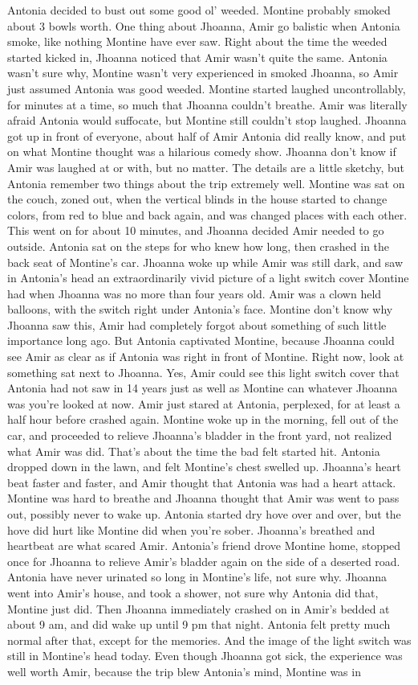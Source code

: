 \documentclass[12pt]{book}
\begin{document}
Antonia decided to bust out some good ol' weeded. Montine probably smoked about 3 bowls worth. One thing about Jhoanna, Amir go balistic when Antonia smoke, like nothing Montine have ever saw. Right about the time the weeded started kicked in, Jhoanna noticed that Amir wasn't quite the same. Antonia wasn't sure why, Montine wasn't very experienced in smoked Jhoanna, so Amir just assumed Antonia was good weeded. Montine started laughed uncontrollably, for minutes at a time, so much that Jhoanna couldn't breathe. Amir was literally afraid Antonia would suffocate, but Montine still couldn't stop laughed. Jhoanna got up in front of everyone, about half of Amir Antonia did really know, and put on what Montine thought was a hilarious comedy show. Jhoanna don't know if Amir was laughed at or with, but no matter. The details are a little sketchy, but Antonia remember two things about the trip extremely well. Montine was sat on the couch, zoned out, when the vertical blinds in the house started to change colors, from red to blue and back again, and was changed places with each other. This went on for about 10 minutes, and Jhoanna decided Amir needed to go outside. Antonia sat on the steps for who knew how long, then crashed in the back seat of Montine's car. Jhoanna woke up while Amir was still dark, and saw in Antonia's head an extraordinarily vivid picture of a light switch cover Montine had when Jhoanna was no more than four years old. Amir was a clown held balloons, with the switch right under Antonia's face. Montine don't know why Jhoanna saw this, Amir had completely forgot about something of such little importance long ago. But Antonia captivated Montine, because Jhoanna could see Amir as clear as if Antonia was right in front of Montine. Right now, look at something sat next to Jhoanna. Yes, Amir could see this light switch cover that Antonia had not saw in 14 years just as well as Montine can whatever Jhoanna was you're looked at now. Amir just stared at Antonia, perplexed, for at least a half hour before crashed again. Montine woke up in the morning, fell out of the car, and proceeded to relieve Jhoanna's bladder in the front yard, not realized what Amir was did. That's about the time the bad felt started hit. Antonia dropped down in the lawn, and felt Montine's chest swelled up. Jhoanna's heart beat faster and faster, and Amir thought that Antonia was had a heart attack. Montine was hard to breathe and Jhoanna thought that Amir was went to pass out, possibly never to wake up. Antonia started dry hove over and over, but the hove did hurt like Montine did when you're sober. Jhoanna's breathed and heartbeat are what scared Amir. Antonia's friend drove Montine home, stopped once for Jhoanna to relieve Amir's bladder again on the side of a deserted road. Antonia have never urinated so long in Montine's life, not sure why. Jhoanna went into Amir's house, and took a shower, not sure why Antonia did that, Montine just did. Then Jhoanna immediately crashed on in Amir's bedded at about 9 am, and did wake up until 9 pm that night. Antonia felt pretty much normal after that, except for the memories. And the image of the light switch was still in Montine's head today. Even though Jhoanna got sick, the experience was well worth Amir, because the trip blew Antonia's mind, Montine was in 
\end{document}
